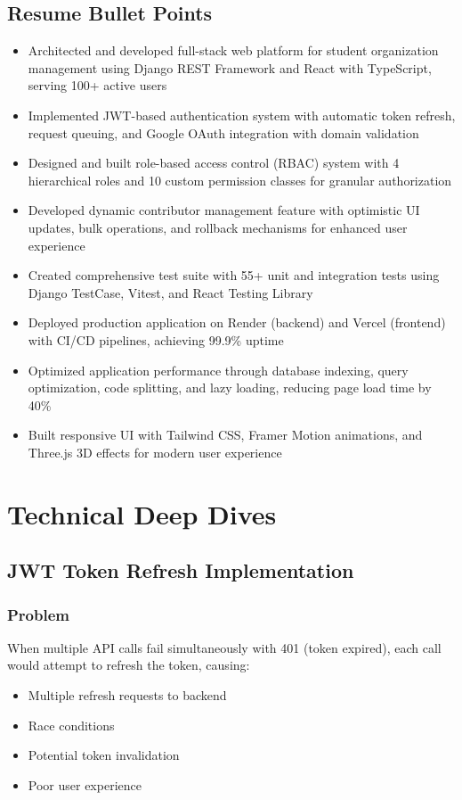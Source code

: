 \documentclass[11pt,a4paper]{article}
\begin{document}
\subsection{Resume Bullet Points}
\begin{itemize}[leftmargin=*]
    \item Architected and developed full-stack web platform for student organization management using Django REST Framework and React with TypeScript, serving 100+ active users
    \item Implemented JWT-based authentication system with automatic token refresh, request queuing, and Google OAuth integration with domain validation
    \item Designed and built role-based access control (RBAC) system with 4 hierarchical roles and 10 custom permission classes for granular authorization
    \item Developed dynamic contributor management feature with optimistic UI updates, bulk operations, and rollback mechanisms for enhanced user experience
    \item Created comprehensive test suite with 55+ unit and integration tests using Django TestCase, Vitest, and React Testing Library
    \item Deployed production application on Render (backend) and Vercel (frontend) with CI/CD pipelines, achieving 99.9\% uptime
    \item Optimized application performance through database indexing, query optimization, code splitting, and lazy loading, reducing page load time by 40\%
    \item Built responsive UI with Tailwind CSS, Framer Motion animations, and Three.js 3D effects for modern user experience
\end{itemize}

\section{Technical Deep Dives}

\subsection{JWT Token Refresh Implementation}

\subsubsection{Problem}
When multiple API calls fail simultaneously with 401 (token expired), each call would attempt to refresh the token, causing:
\begin{itemize}[leftmargin=*]
    \item Multiple refresh requests to backend
    \item Race conditions
    \item Potential token invalidation
    \item Poor user experience
\end{itemize}
\end{document}
